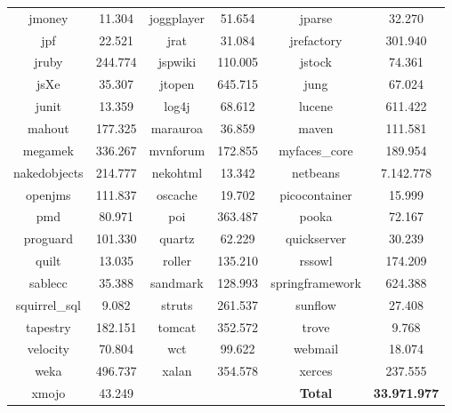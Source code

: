 \begin{table}
\begin{tabularx}{\textwidth}{c|c||c|c||C|c}
		jmoney & 11.304 & joggplayer & 51.654 & jparse & 32.270 \\
		jpf & 22.521 & jrat & 31.084 & jrefactory & 301.940 \\
		jruby & 244.774 & jspwiki & 110.005 & jstock & 74.361 \\
		jsXe & 35.307 & jtopen & 645.715 & jung & 67.024 \\
		junit & 13.359 & log4j & 68.612 & lucene & 611.422 \\
		mahout & 177.325 & marauroa & 36.859 & maven & 111.581 \\
		megamek & 336.267 & mvnforum & 172.855 & myfaces\_core & 189.954 \\
		nakedobjects & 214.777 & nekohtml & 13.342 & netbeans & 7.142.778 \\
		openjms & 111.837 & oscache & 19.702 & picocontainer & 15.999 \\
		pmd & 80.971 & poi & 363.487 & pooka & 72.167 \\
		proguard & 101.330 & quartz & 62.229 & quickserver & 30.239 \\
		quilt & 13.035 & roller & 135.210 & rssowl & 174.209 \\
		sablecc & 35.388 & sandmark & 128.993 & springframework & 624.388 \\
		squirrel\_sql & 9.082 & struts & 261.537 & sunflow & 27.408 \\
		tapestry & 182.151 & tomcat & 352.572 & trove & 9.768 \\
		velocity & 70.804 & wct & 99.622 & webmail & 18.074 \\
		weka & 496.737 & xalan & 354.578 & xerces & 237.555 \\
		xmojo & 43.249 & & & \textbf{Total} & \textbf{33.971.977}
	\end{tabularx}
\end{table}
\setlength{\extrarowheight}{0em}